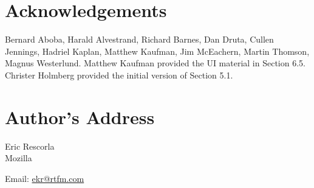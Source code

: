 \documentclass{article}
\begin{document}
\section*{Acknowledgements}

Bernard Aboba, Harald Alvestrand, Richard Barnes, Dan Druta, Cullen
Jennings, Hadriel Kaplan, Matthew Kaufman, Jim McEachern, Martin
Thomson, Magnus Westerlund.  Matthew Kaufman provided the UI material
in Section 6.5.  Christer Holmberg provided the initial version of
Section 5.1.

\section*{Author's Address}

Eric Rescorla\\
Mozilla

Email: \href{mailto:ekr@rtfm.com}{ekr@rtfm.com}
\end{document}
